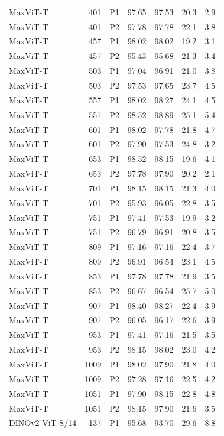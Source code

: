 {\begin{longtable}{lrlrrrr}
MaxViT-T & 401 & P1 & 97.65 & 97.53 & 20.3 & 2.9 \\
MaxViT-T & 401 & P2 & 97.78 & 97.78 & 22.1 & 3.8 \\
MaxViT-T & 457 & P1 & 98.02 & 98.02 & 19.2 & 3.1 \\
MaxViT-T & 457 & P2 & 95.43 & 95.68 & 21.3 & 3.4 \\
MaxViT-T & 503 & P1 & 97.04 & 96.91 & 21.0 & 3.8 \\
MaxViT-T & 503 & P2 & 97.53 & 97.65 & 23.7 & 4.5 \\
MaxViT-T & 557 & P1 & 98.02 & 98.27 & 24.1 & 4.5 \\
MaxViT-T & 557 & P2 & 98.52 & 98.89 & 25.1 & 5.4 \\
MaxViT-T & 601 & P1 & 98.02 & 97.78 & 21.8 & 4.7 \\
MaxViT-T & 601 & P2 & 97.90 & 97.53 & 24.8 & 3.2 \\
MaxViT-T & 653 & P1 & 98.52 & 98.15 & 19.6 & 4.1 \\
MaxViT-T & 653 & P2 & 97.78 & 97.90 & 20.2 & 2.1 \\
MaxViT-T & 701 & P1 & 98.15 & 98.15 & 21.3 & 4.0 \\
MaxViT-T & 701 & P2 & 95.93 & 96.05 & 22.8 & 3.5 \\
MaxViT-T & 751 & P1 & 97.41 & 97.53 & 19.9 & 3.2 \\
MaxViT-T & 751 & P2 & 96.79 & 96.91 & 20.8 & 3.5 \\
MaxViT-T & 809 & P1 & 97.16 & 97.16 & 22.4 & 3.7 \\
MaxViT-T & 809 & P2 & 96.91 & 96.54 & 23.1 & 4.5 \\
MaxViT-T & 853 & P1 & 97.78 & 97.78 & 21.9 & 3.5 \\
MaxViT-T & 853 & P2 & 96.67 & 96.54 & 25.7 & 5.0 \\
MaxViT-T & 907 & P1 & 98.40 & 98.27 & 22.4 & 3.9 \\
MaxViT-T & 907 & P2 & 96.05 & 96.17 & 22.6 & 3.9 \\
MaxViT-T & 953 & P1 & 97.41 & 97.16 & 21.5 & 3.5 \\
MaxViT-T & 953 & P2 & 98.15 & 98.02 & 23.0 & 4.2 \\
MaxViT-T & 1009 & P1 & 98.02 & 97.90 & 21.8 & 4.0 \\
MaxViT-T & 1009 & P2 & 97.28 & 97.16 & 22.5 & 4.2 \\
MaxViT-T & 1051 & P1 & 97.90 & 98.15 & 22.8 & 4.8 \\
MaxViT-T & 1051 & P2 & 98.15 & 97.90 & 21.6 & 3.5 \\
DINOv2 ViT-S/14 & 137 & P1 & 95.68 & 93.70 & 29.6 & 8.8 \\

\end{longtable}}
